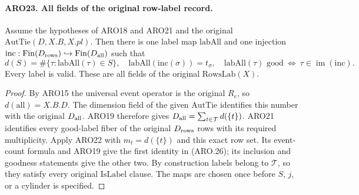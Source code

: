 \documentclass[11pt,a4paper]{article}
\numberwithin{equation}{section}
\theoremstyle{remark}\newtheorem{remark}[theorem]{Remark}
\begin{document}
\paragraph{ARO23. All fields of the original row-label record.}
\label{claim:ARO23}
Assume the hypotheses of ARO18 and ARO21 and the original
\(\mathrm{AutTie}(D,X.B,X.pl)\).  Then there is one label map
\(\mathrm{labAll}\) and one injection
\(\mathrm{inc}:\mathrm{Fin}(D_{\rm rows})\hookrightarrow
\mathrm{Fin}(D_{\rm all})\) such that
\[
 d(S)=\#\{\tau:\mathrm{labAll}(\tau)\in S\},
 \quad \mathrm{labAll}(\mathrm{inc}(\sigma))=t_\sigma,
 \quad \mathrm{labAll}(\tau)\text{ good}\ \Longleftrightarrow\
                           \tau\in\operatorname{im}(\mathrm{inc}).
 \tag{ARO.26}
\]
Every label is valid.  These are all fields of the original
\(\mathrm{RowsLab}(X)\).
\begin{proof}
By ARO15 the universal event operator is the original \(R_e\),
so \(d(\mathrm{all})=X.B.D\).  The dimension field of the given
\(\mathrm{AutTie}\) identifies this number with the original
\(D_{\rm all}\).  ARO19 therefore gives
\(D_{\rm all}=\sum_{t\in\mathcal T}d(\{t\})\).
ARO21 identifies every good-label fiber of the original
\(D_{\rm rows}\) rows with its required multiplicity.
Apply ARO22 with \(m_t=d(\{t\})\) and this exact row set.
Its event-count formula and ARO19 give the first identity in
(ARO.26); its inclusion and goodness statements give the other
two.  By construction labels belong to \(\mathcal T\), so they
satisfy every original \(\mathrm{IsLabel}\) clause.  The maps are
chosen once before \(S\), \(j\), or a cylinder is specified.
\end{proof}

\end{document}
